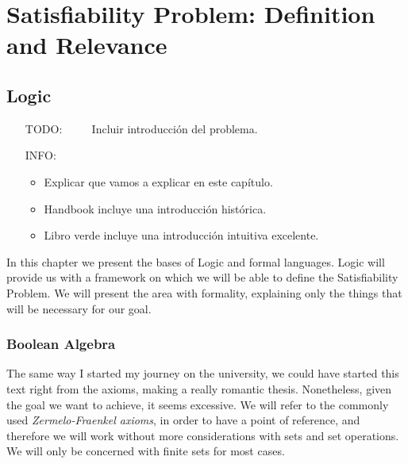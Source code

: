 
\part{Satisfiability Problem: Definition and Relevance} %

\label{Chapter1} %


\newcommand{\keyword}[1]{\textbf{#1}}
\newcommand{\tabhead}[1]{\textbf{#1}}
\newcommand{\code}[1]{\texttt{#1}}
\newcommand{\file}[1]{\texttt{\bfseries#1}}
\newcommand{\option}[1]{\texttt{\itshape#1}}


\chapter{Logic}

\begin{itemize}
\item[TODO:]$\qquad$ Incluir introducción del problema.

\item[INFO:]
  \begin{itemize}
  \item Explicar que vamos a explicar en este capítulo.
  \item Handbook incluye una introducción histórica.
  \item Libro verde incluye una introducción intuitiva excelente.
\end{itemize}
\end{itemize}


In this chapter we present the bases of Logic and formal languages. Logic will provide us with a framework on which we will be able to define the Satisfiability Problem. We will present the area with formality, explaining only the things that will be necessary for our goal.


\section{Boolean Algebra}

The same way I started my journey on the university, we could have started this text right from the axioms, making a really romantic thesis. Nonetheless, given the goal we want to achieve, it seems excessive. We will refer to the commonly used \emph{Zermelo-Fraenkel axioms}, in order to have a point of reference, and therefore we will work without more considerations with sets and set operations. We will only be concerned with finite sets for most cases.\\

